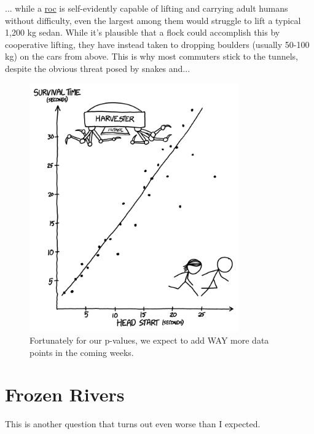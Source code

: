 {... while a \href{https://en.wikipedia.org/wiki/Roc\_(mythology)}{roc} is self-evidently capable of lifting and carrying adult humans without difficulty, even the largest among them would struggle to lift a typical 1,200 kg sedan. While it's plausible that a flock could accomplish this by cooperative lifting, they have instead taken to dropping boulders (usually 50-100 kg) on the cars from above. This is why most commuters stick to the tunnels, despite the obvious threat posed by snakes and...


\begin{figure}[!htbp]
\centering
\includegraphics[scale=0.5, max width=0.8\textwidth]{imgs/a/120/harvester.png}
\caption{Fortunately for our p-values, we expect to add WAY more data points in the coming weeks.}
\end{figure}

{
\chapter{Frozen Rivers}
}

\hfill{}

{This is another question that turns out even worse than I expected.}

}
